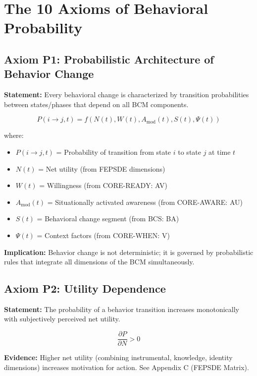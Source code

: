 \documentclass[11pt, a4paper]{article}
\begin{document}
\section{The 10 Axioms of Behavioral Probability}

\subsection{Axiom P1: Probabilistic Architecture of Behavior Change}

\textbf{Statement:} Every behavioral change is characterized by transition probabilities between states/phases that depend on all BCM components.

\begin{equation}
P(i \to j, t) = f(N(t), W(t), A_{\text{mod}}(t), S(t), \Psi(t))
\end{equation}

where:
\begin{itemize}[nosep]
    \item $P(i \to j, t)$ = Probability of transition from state $i$ to state $j$ at time $t$
    \item $N(t)$ = Net utility (from FEPSDE dimensions)
    \item $W(t)$ = Willingness (from CORE-READY: AV)
    \item $A_{\text{mod}}(t)$ = Situationally activated awareness (from CORE-AWARE: AU)
    \item $S(t)$ = Behavioral change segment (from BCS: BA)
    \item $\Psi(t)$ = Context factors (from CORE-WHEN: V)
\end{itemize}

\textbf{Implication:} Behavior change is not deterministic; it is governed by probabilistic rules that integrate all dimensions of the BCM simultaneously.

\subsection{Axiom P2: Utility Dependence}

\textbf{Statement:} The probability of a behavior transition increases monotonically with subjectively perceived net utility.

\begin{equation}
\frac{\partial P}{\partial N} > 0
\end{equation}

\textbf{Evidence:} Higher net utility (combining instrumental, knowledge, identity dimensions) increases motivation for action. See Appendix C (FEPSDE Matrix).
\end{document}
